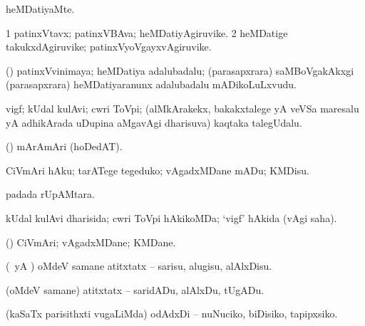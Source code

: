 {{{{{{\bentry
{} 
\gl{\kirxvi}
\expl{}
\bmng
heMDatiyaMte. 
\emng
\eentry

\bentry
{} 
\gl{\nA}
\expl{}
\bmng
\bnum
\num{1} patinxVtavx; patinxVBAva; heMDatiyAgiruvike. 
\num{2} heMDatige takukxdAgiruvike; patinxVyoVgayxvAgiruvike. 
\enum
\emng
\eentry

\bentry
{} 
\gl{\gu}
\expl{}
\bmng
{} 
\emng
\eentry

\bentry
{} 
\gl{\nA}
\expl{}
\bmng
(\AmA) patinxVvinimaya; heMDatiya adalubadalu; (parasapxrara) saMBoVgakAkxgi (parasapxrara) heMDatiyaranunx adalubadalu mADikoLuLxvudu. 
\emng
\eentry

\bentry
{}
  \gl{\gu}\bmng
{} 
\emng
\eentry

\bentry 
{} 
\gl{\nA}
\expl{}
\bmng
vigf; kUdal kulAvi; cwri ToVpi; (alMkArakekx, bakakxtalege yA veVSa maresalu yA adhikArada uDupina aMgavAgi dharisuva) kaqtaka talegUdalu. 
\emng

\noindent
\gl{\pagu}
\bmng
{} (\pArxparx) mArAmAri (hoDedAT). 
\emng
\eentry

 \bentry
{}
\gl{\sakirx}
\bmng
CiVmAri hAku; tarATege tegeduko; vAgadxMDane mADu; KMDisu. 
\emng
\eentry

\bentry
{}
  \gl{\nA}\bmng
{} padada rUpAMtara. 
\emng
\eentry

\bentry
{}
  \gl{\gu}\bmng
kUdal kulAvi dharisida; cwri ToVpi hAkikoMDa; `vigf' hAkida (\saupa vAgi saha). 
\emng
\eentry

\bentry
{}
  \gl{\nA}\bmng
(\AmA) CiVmAri; vAgadxMDane; KMDane. 
\emng
\eentry

\bentry
{} 
\gl{\sakirx}
\expl{}
\bmng
(\AmA\ yA \pArxM) oMdeV samane atitxtatx -- sarisu, alugisu, alAlxDisu. 
\emng

\noindent
\gl{\akirx}
\bmng
(oMdeV samane) atitxtatx -- saridADu, alAlxDu, tUgADu. 
\emng

\noindent 
\gl{\pagu}
\bmng
{} (kaSaTx parisithxti \mo vugaLiMda) odAdxDi -- nuNuciko, biDisiko, tapipxsiko. 
\emng
\eentry

}}}}}}
